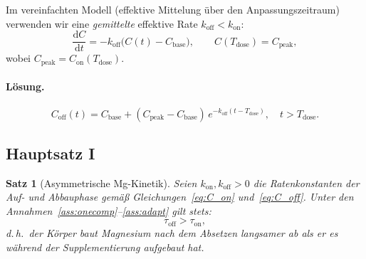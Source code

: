 ﻿\documentclass[12pt,a4paper]{article}
\theoremstyle{plain}
\newtheorem{theorem}{Satz}[section]
\theoremstyle{definition}
\theoremstyle{remark}
\begin{document}
Im vereinfachten Modell (effektive Mittelung über den Anpassungszeitraum)
verwenden wir eine \emph{gemittelte} effektive Rate $k_\text{off} < k_\text{on}$:
\begin{equation}
  \frac{\mathrm{d}C}{\mathrm{d}t} = -k_\text{off}\bigl(C(t) - C_\text{base}\bigr),
  \qquad C(T_\text{dose}) = C_\text{peak},
  \label{eq:washout}
\end{equation}
wobei $C_\text{peak} = C_\text{on}(T_\text{dose})$.

\paragraph{Lösung.}
\begin{equation}
  \boxed{C_\text{off}(t) = C_\text{base} + (C_\text{peak}-C_\text{base})\,
    e^{-k_\text{off}(t-T_\text{dose})}, \quad t > T_\text{dose}.}
  \label{eq:C_off}
\end{equation}

\subsection{Hauptsatz I}

\begin{theorem}[Asymmetrische Mg-Kinetik]
\label{thm:mg}
Seien $k_\text{on}, k_\text{off} > 0$ die Raten\-konstanten der Auf- und
Abbauphase gemäß Gleichungen~\eqref{eq:C_on} und~\eqref{eq:C_off}. Unter
den Annahmen~\ref{ass:onecomp}--\ref{ass:adapt} gilt stets:
\begin{equation}
  \tau_\text{off} > \tau_\text{on},
  \label{eq:asymm}
\end{equation}
d.\,h.\ der Körper baut Magnesium nach dem Absetzen \emph{langsamer} ab
als er es während der Supplementierung aufgebaut hat.
\end{theorem}
\end{document}
